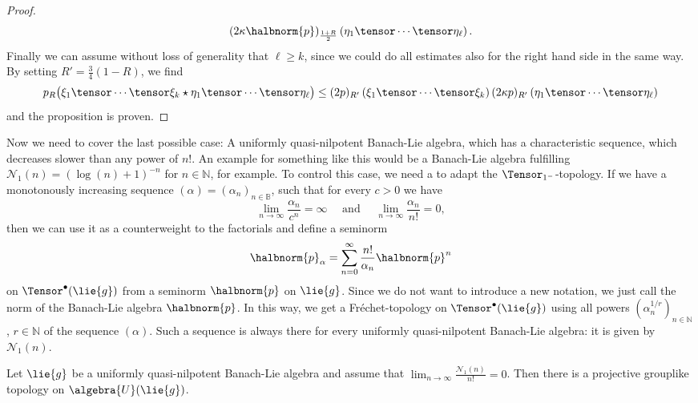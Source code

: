 \documentclass[
11pt,                          %
english                        %
]{article}
\begin{document}
\begin{proof}
\begin{align*}
		(2 \kappa \halbnorm{p})_{\frac{1 + R}{2}} 
		\left( \eta_1 \tensor \cdots \tensor \eta_\ell \right).
	\end{align*}
	Finally we can assume without loss of generality that $\ell \geq k$, since
	we could do all estimates also for the right hand side in the same way.
	By setting $R' = \frac{3}{4}(1-R)$, we find
	\begin{equation*}
		p_R \big(
			\xi_1 \tensor \cdots \tensor \xi_k
			\star
			\eta_1 \tensor \cdots \tensor \eta_\ell
		\big)
		\leq
		(2p)_{R'}
		\left( \xi_1 \tensor \cdots \tensor \xi_k \right)
		(2 \kappa p)_{R'}
		\left( \eta_1 \tensor \cdots \tensor \eta_\ell \right)
	\end{equation*}
	and the proposition is proven.
\end{proof}

Now we need to cover the last possible case: A uniformly quasi-nilpotent Banach-Lie 
algebra, which has a characteristic sequence, which decreases slower than any power 
of $n!$. An example for something like this would be a Banach-Lie algebra fulfilling 
$\mathcal{N}_1(n) = (\log(n) + 1)^{-n}$ for $n \in \mathbb{N}$, for example. To 
control this case, we need a to adapt the $\Tensor_{1^-}$-topology. If we have a 
monotonously increasing sequence $(\alpha) = (\alpha_n)_{n \in \mathbb{B}}$, such 
that for every $c > 0$ we have
\begin{equation}
	\lim\limits_{n \rightarrow \infty}
	\frac{\alpha_n}{c^n}
	=
	\infty
	\quad \text{ and } \quad
	\lim\limits_{n \rightarrow \infty}
	\frac{\alpha_n}{n!}
	=
	0,
\end{equation}
then we can use it as a counterweight to the factorials and define a seminorm
\begin{equation}
	\halbnorm{p}_\alpha
	=
	\sum\limits_{n=0}^\infty
	\frac{n!}{\alpha_n}
	\halbnorm{p}^n
\end{equation}
on $\Tensor^{\bullet}(\lie{g})$ from a seminorm $\halbnorm{p}$ on $\lie{g}$. Since 
we do not want to introduce a new notation, we just call the norm of the Banach-Lie 
algebra $\halbnorm{p}$. In this way, we get a Fr\'echet-topology on 
$\Tensor^{\bullet}(\lie{g})$ using all powers $(\alpha_n^{1/r})_{n \in \mathbb{N}}$, 
$r \in \mathbb{N}$ of the sequence $(\alpha)$. Such a sequence is always there for 
every uniformly quasi-nilpotent Banach-Lie algebra: it is given by 
$\mathcal{N}_1(n)$.
\begin{proposition}
	\label{prop:mainthm_rev_2}
	Let $\lie{g}$ be a uniformly quasi-nilpotent Banach-Lie algebra and assume that 
	$\lim_{n \rightarrow \infty} \frac{\mathcal{N}_1(n)}{n!} = 0$. 
	Then there is a projective grouplike topology on $\algebra{U}(\lie{g})$.
\end{proposition}
\end{document}
